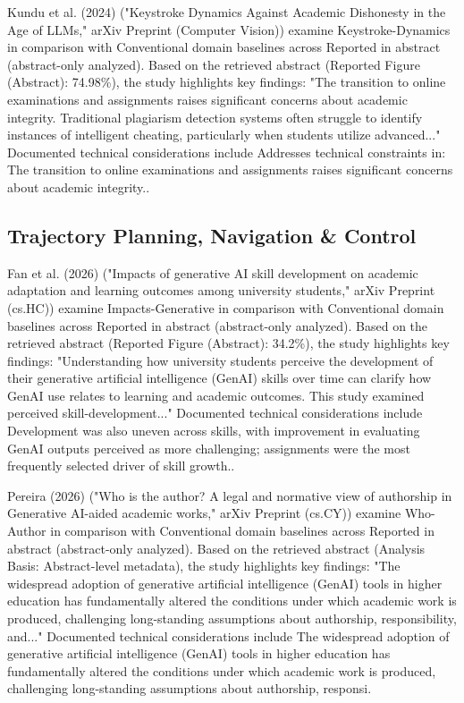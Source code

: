 \documentclass[10pt,twocolumn,letterpaper]{article}
\begin{document}
Kundu et al. (2024) \cite{ref20} ("Keystroke Dynamics Against Academic Dishonesty in the Age of LLMs," arXiv Preprint (Computer Vision)) examine Keystroke-Dynamics in comparison with Conventional domain baselines across Reported in abstract (abstract-only analyzed). Based on the retrieved abstract (Reported Figure (Abstract): 74.98\%), the study highlights key findings: "The transition to online examinations and assignments raises significant concerns about academic integrity. Traditional plagiarism detection systems often struggle to identify instances of intelligent cheating, particularly when students utilize advanced..." Documented technical considerations include Addresses technical constraints in: The transition to online examinations and assignments raises significant concerns about academic integrity..

\subsection{Trajectory Planning, Navigation \& Control}
Fan et al. (2026) \cite{ref11} ("Impacts of generative AI skill development on academic adaptation and learning outcomes among university students," arXiv Preprint (cs.HC)) examine Impacts-Generative in comparison with Conventional domain baselines across Reported in abstract (abstract-only analyzed). Based on the retrieved abstract (Reported Figure (Abstract): 34.2\%), the study highlights key findings: "Understanding how university students perceive the development of their generative artificial intelligence (GenAI) skills over time can clarify how GenAI use relates to learning and academic outcomes. This study examined perceived skill-development..." Documented technical considerations include Development was also uneven across skills, with improvement in evaluating GenAI outputs perceived as more challenging; assignments were the most frequently selected driver of skill growth..

Pereira (2026) \cite{ref13} ("Who is the author? A legal and normative view of authorship in Generative AI-aided academic works," arXiv Preprint (cs.CY)) examine Who-Author in comparison with Conventional domain baselines across Reported in abstract (abstract-only analyzed). Based on the retrieved abstract (Analysis Basis: Abstract-level metadata), the study highlights key findings: "The widespread adoption of generative artificial intelligence (GenAI) tools in higher education has fundamentally altered the conditions under which academic work is produced, challenging long-standing assumptions about authorship, responsibility, and..." Documented technical considerations include The widespread adoption of generative artificial intelligence (GenAI) tools in higher education has fundamentally altered the conditions under which academic work is produced, challenging long-standing assumptions about authorship, responsi.
\end{document}
